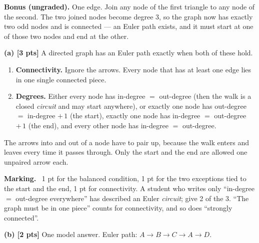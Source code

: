 \documentclass[a4paper, 12pt]{extarticle}
\newenvironment{grading}
  {\begin{tcolorbox}[colback=pltblue!4, colframe=pltblue!35, boxrule=0.5pt,
                     sharp corners, boxsep=2pt, left=6pt, right=6pt,
                     top=4pt, bottom=4pt]\small\textbf{Marking.}\ }
  {\end{tcolorbox}}
\begin{document}
\vspace{0.3em}

{\small\textbf{Bonus (ungraded).} One edge. Join any node of the first triangle
to any node of the second. The two joined nodes become degree $3$, so the graph
now has exactly two odd nodes and is connected --- an Euler path exists, and it
must start at one of those two nodes and end at the other.}

\newpage


\textbf{(a) [3 pts]} A directed graph has an Euler path exactly when both of
these hold.

\begin{enumerate}[label=\arabic*., leftmargin=1.8em, itemsep=0.2em, topsep=0.2em]
  \item \textbf{Connectivity.} Ignore the arrows. Every node that has at least
        one edge lies in one single connected piece.
  \item \textbf{Degrees.} Either every node has in-degree $=$ out-degree
        (then the walk is a closed \emph{circuit} and may start anywhere), or
        exactly one node has out-degree $=$ in-degree $+\,1$ (the start),
        exactly one node has in-degree $=$ out-degree $+\,1$ (the end), and
        every other node has in-degree $=$ out-degree.
\end{enumerate}

The arrows into and out of a node have to pair up, because the walk enters and
leaves every time it passes through. Only the start and the end are allowed one
unpaired arrow each.

\begin{grading}
1 pt for the balanced condition, 1 pt for the two exceptions tied to the start
and the end, 1 pt for connectivity. A student who writes only ``in-degree $=$
out-degree everywhere'' has described an Euler \emph{circuit}; give 2 of the 3.
``The graph must be in one piece'' counts for connectivity, and so does
``strongly connected''.
\end{grading}

\textbf{(b) [2 pts]} One model answer. Euler path:
$A \to B \to C \to A \to D$.

\begin{center}
\end{center}
\end{document}
